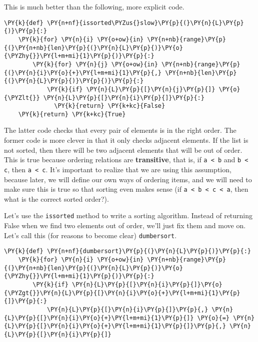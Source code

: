 This is much better than the following, more explicit code.

\begin{Verbatim}[commandchars=\\\{\}]
\PY{k}{def} \PY{n+nf}{issorted\PYZus{}slow}\PY{p}{(}\PY{n}{L}\PY{p}{)}\PY{p}{:}
    \PY{k}{for} \PY{n}{i} \PY{o+ow}{in} \PY{n+nb}{range}\PY{p}{(}\PY{n+nb}{len}\PY{p}{(}\PY{n}{L}\PY{p}{)}\PY{o}{\PYZhy{}}\PY{l+m+mi}{1}\PY{p}{)}\PY{p}{:}
        \PY{k}{for} \PY{n}{j} \PY{o+ow}{in} \PY{n+nb}{range}\PY{p}{(}\PY{n}{i}\PY{o}{+}\PY{l+m+mi}{1}\PY{p}{,} \PY{n+nb}{len}\PY{p}{(}\PY{n}{L}\PY{p}{)}\PY{p}{)}\PY{p}{:}
            \PY{k}{if} \PY{n}{L}\PY{p}{[}\PY{n}{j}\PY{p}{]} \PY{o}{\PYZlt{}} \PY{n}{L}\PY{p}{[}\PY{n}{i}\PY{p}{]}\PY{p}{:}
              \PY{k}{return} \PY{k+kc}{False}
    \PY{k}{return} \PY{k+kc}{True}
\end{Verbatim}



The latter code checks that every pair of elements is in the right order.
The former code is more clever in that it only checks adjacent elements.
If the list is not sorted, then there will be two adjacent elements that will be out of order.
This is true because ordering relations are \textbf{transitive}, that is, if \texttt{a < b} and \texttt{b < c}, then \texttt{a < c}.
It's important to realize that we are using this assumption, because later, we will define our own ways of ordering items, and we will need to make sure this is true so that sorting even makes sense (if \texttt{a < b < c < a}, then what is the correct sorted order?).


Let's use the \texttt{issorted} method to write a sorting algorithm.
Instead of returning False when we find two elements out of order, we'll just fix them and move on.  Let's call this (for reasons to become clear) \texttt{dumbersort}.

\begin{Verbatim}[commandchars=\\\{\}]
\PY{k}{def} \PY{n+nf}{dumbersort}\PY{p}{(}\PY{n}{L}\PY{p}{)}\PY{p}{:}
    \PY{k}{for} \PY{n}{i} \PY{o+ow}{in} \PY{n+nb}{range}\PY{p}{(}\PY{n+nb}{len}\PY{p}{(}\PY{n}{L}\PY{p}{)}\PY{o}{\PYZhy{}}\PY{l+m+mi}{1}\PY{p}{)}\PY{p}{:}
        \PY{k}{if} \PY{n}{L}\PY{p}{[}\PY{n}{i}\PY{p}{]}\PY{o}{\PYZgt{}}\PY{n}{L}\PY{p}{[}\PY{n}{i}\PY{o}{+}\PY{l+m+mi}{1}\PY{p}{]}\PY{p}{:}
            \PY{n}{L}\PY{p}{[}\PY{n}{i}\PY{p}{]}\PY{p}{,} \PY{n}{L}\PY{p}{[}\PY{n}{i}\PY{o}{+}\PY{l+m+mi}{1}\PY{p}{]} \PY{o}{=} \PY{n}{L}\PY{p}{[}\PY{n}{i}\PY{o}{+}\PY{l+m+mi}{1}\PY{p}{]}\PY{p}{,} \PY{n}{L}\PY{p}{[}\PY{n}{i}\PY{p}{]}
\end{Verbatim}



